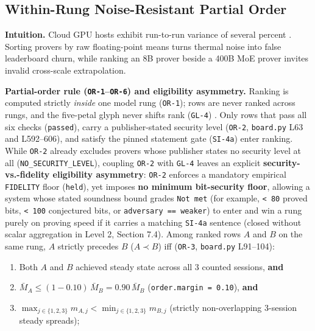 \documentclass[11pt,letterpaper]{article}
\begin{document}
\subsection{Within-Rung Noise-Resistant Partial Order}

\textbf{Intuition.} Cloud GPU hosts exhibit run-to-run variance of several percent \cite{iproofs2026}. Sorting provers by raw floating-point means turns thermal noise into false leaderboard churn, while ranking an 8B prover beside a 400B MoE prover invites invalid cross-scale extrapolation.

\textbf{Partial-order rule (\texttt{OR-1}--\texttt{OR-6}) and eligibility asymmetry.} Ranking is computed strictly \textit{inside} one model rung (\texttt{OR-1}); rows are never ranked across rungs, and the five-petal glyph never shifts rank (\texttt{GL-4}) \cite{iproofs2026}. Only rows that pass all six checks (\texttt{passed}), carry a publisher-stated security level (\texttt{OR-2}, \texttt{board.\allowbreak{}py} L63 and L592--606), and satisfy the pinned statement gate (\texttt{SI-4a}) enter ranking. While \texttt{OR-2} already excludes provers whose publisher states no security level at all (\texttt{NO\_\allowbreak{}SECURITY\_\allowbreak{}LEVEL}), coupling \texttt{OR-2} with \texttt{GL-4} leaves an explicit \textbf{security-vs.-fidelity eligibility asymmetry}: \texttt{OR-2} enforces a mandatory empirical \texttt{FIDELITY} floor (\texttt{held}), yet imposes \textbf{no minimum bit-security floor}, allowing a system whose stated soundness bound grades \texttt{Not met} (for example, \texttt{< 80} proved bits, \texttt{< 100} conjectured bits, or \texttt{adversary == weaker}) to enter and win a rung purely on proving speed if it carries a matching \texttt{SI-4a} sentence (closed without scalar aggregation in Level 2, Section 7.4). Among ranked rows $A$ and $B$ on the same rung, $A$ strictly precedes $B$ ($A \prec B$) iff (\texttt{OR-3}, \texttt{board.\allowbreak{}py} L91--104):

\begin{enumerate}
\item Both $A$ and $B$ achieved steady state across all 3 counted sessions, \textbf{and}
\item $\bar{M}_A \le (1 - 0.10)\,\bar{M}_B = 0.90\,\bar{M}_B$ (\texttt{order.\allowbreak{}margin = 0.10}), \textbf{and}
\item $\max_{j \in \{1,2,3\}} m_{A,j} < \min_{j \in \{1,2,3\}} m_{B,j}$ (strictly non-overlapping 3-session steady spreads);
\end{enumerate}
\end{document}
